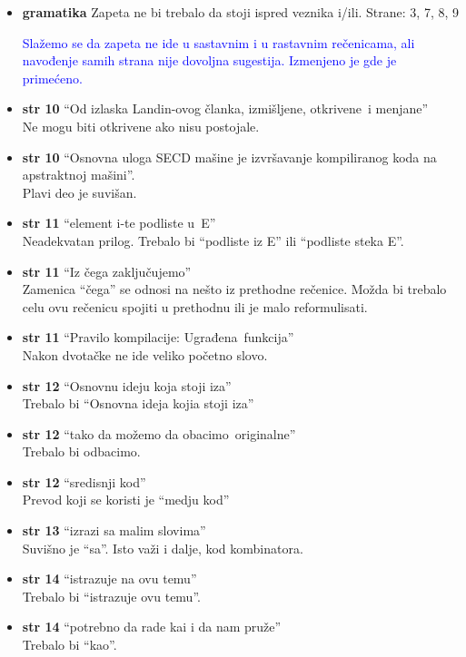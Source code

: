 \documentclass[a4paper]{report}
\newcommand{\odgovor}[1]{\textcolor{blue}{#1}}
\begin{document}
\begin{itemize}
\item \textbf{gramatika} Zapeta ne bi trebalo da stoji ispred veznika i/ili. Strane: 3, 7, 8, 9

\odgovor{Slažemo se da zapeta ne ide u sastavnim i u rastavnim rečenicama, ali navođenje samih strana nije dovoljna sugestija. Izmenjeno je gde je primećeno.}
\item \textbf{str 10} ``Od izlaska Landin-ovog članka, izmišljene, \color{blue}otkrivene\color{black}~i menjane'' \\ Ne mogu biti otkrivene ako nisu postojale.
\item \textbf{str 10} ``Osnovna uloga SECD mašine je izvršavanje kompiliranog koda \color{blue}na apstraktnoj mašini\color{black}''. \\ Plavi deo je suvišan.
\item \textbf{str 11} ``element i-te podliste \color{blue}u\color{black}~E'' \\ Neadekvatan prilog. Trebalo bi ``podliste iz E'' ili ``podliste steka E''.
\item \textbf{str 11} ``Iz čega zaključujemo'' \\ Zamenica ``čega'' se odnosi na nešto iz prethodne rečenice. Možda bi trebalo celu ovu rečenicu spojiti u prethodnu ili je malo reformulisati.
\item \textbf{str 11} ``Pravilo kompilacije: \color{blue}Ugrađena\color{black}~funkcija'' \\ Nakon dvotačke ne ide veliko početno slovo.
\item \textbf{str 12} ``Osnovnu ideju koja stoji iza'' \\ Trebalo bi ``Osnovna ideja kojia stoji iza''
\item \textbf{str 12} ``tako da možemo da \color{blue}obacimo\color{black}~originalne'' \\ Trebalo bi \color{blue}odbacimo\color{black}.
\item \textbf{str 12} ``sredisnji kod'' \\ Prevod koji se koristi je ``medju kod''
\item \textbf{str 13} ``izrazi \color{blue}sa\color{black} malim slovima'' \\ Suvišno je ``sa''. Isto važi i dalje, kod kombinatora.
\item \textbf{str 14} ``istrazuje na ovu temu'' \\ Trebalo bi ``istrazuje ovu temu''.
\item \textbf{str 14} ``potrebno da rade \color{blue}kai\color{black} i da nam pruže'' \\ Trebalo bi ``kao''.

\end{itemize}
\end{document}
